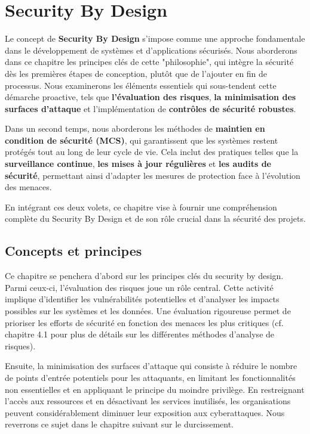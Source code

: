 \section{Security By Design}

Le concept de \textbf{Security By Design} s'impose comme une approche fondamentale dans le développement de systèmes et d'applications sécurisés. Nous aborderons dans ce chapitre les principes clés de cette "philosophie", qui intègre la sécurité dès les premières étapes de conception, plutôt que de l'ajouter en fin de processus. Nous examinerons les éléments essentiels qui sous-tendent cette démarche proactive, tels que \textbf{l'évaluation des risques}, \textbf{la minimisation des surfaces d'attaque} et l'implémentation de \textbf{contrôles de sécurité robustes}.

Dans un second temps, nous aborderons les méthodes de \textbf{maintien en condition de sécurité (MCS)}, qui garantissent que les systèmes restent protégés tout au long de leur cycle de vie. Cela inclut des pratiques telles que la \textbf{surveillance continue}, \textbf{les mises à jour régulières} et \textbf{les audits de sécurité}, permettant ainsi d'adapter les mesures de protection face à l'évolution des menaces. 

En intégrant ces deux volets, ce chapitre vise à fournir une compréhension complète du Security By Design et de son rôle crucial dans la sécurité des projets.

\subsection{Concepts et principes}

Ce chapitre se penchera d'abord sur les principes clés du security by design. Parmi ceux-ci, l'évaluation des risques joue un rôle central. 
Cette activité implique d'identifier les vulnérabilités potentielles et d'analyser les impacts possibles sur les systèmes et les données. Une évaluation rigoureuse permet de prioriser les efforts de sécurité en fonction des menaces les plus critiques (cf. chapitre 4.1 pour plus de détails sur les différentes méthodes d'analyse de risques).

Ensuite, la minimisation des surfaces d'attaque qui consiste à réduire le nombre de points d'entrée potentiels pour les attaquants, en limitant les fonctionnalités non essentielles et en appliquant le principe du moindre privilège. En restreignant l'accès aux ressources et en désactivant les services inutilisés, les organisations peuvent considérablement diminuer leur exposition aux cyberattaques. Nous reverrons ce sujet dans le chapitre suivant sur le durcissement.

